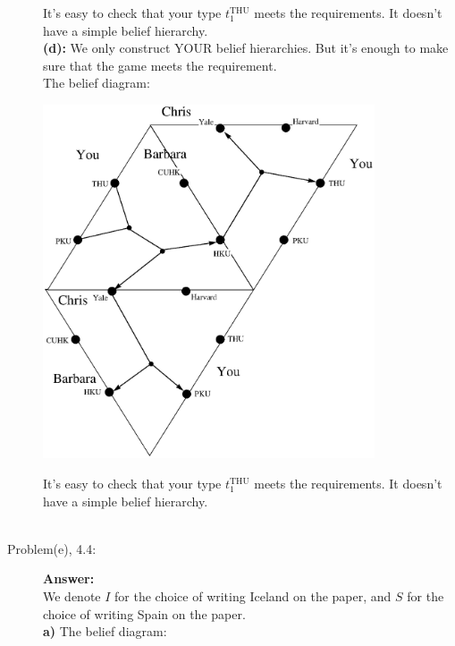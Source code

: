 \documentclass{article}
\begin{document}
\begin{description}
    It's easy to check that your type $t_1^{\text{THU}}$ meets the requirements. It doesn't have a simple belief hierarchy. \\\newpage
    {\bf (d):}
    We only construct YOUR belief hierarchies. But it's enough to make sure that the game meets the requirement.\\
    The belief diagram:
    \begin{center}
                    \includegraphics[angle=0, width=0.8\textwidth]{ECON3160A3P4}\\
    \end{center}
    It's easy to check that your type $t_1^{\text{THU}}$ meets the requirements. It doesn't have a simple belief hierarchy. \\\\
    \item[Problem(e), 4.4:]{\bf Answer:}\\
    We denote $I$ for the choice of writing Iceland on the paper, and $S$ for the choice of writing Spain on the paper.\\\newpage
    {\bf a)}
    The belief diagram:
    \begin{center}

\end{center}
\end{description}
\end{document}
